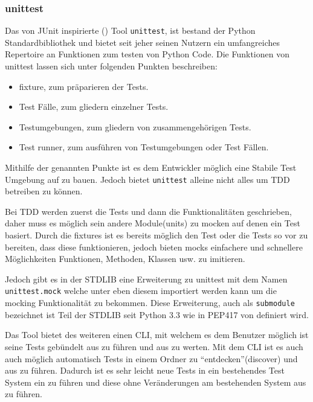 \subsubsection{unittest}\label{python-tools:unittest}

Das von JUnit inspirierte (\cite{docs.python:unittest}) Tool \lstinline|unittest|, ist bestand
der Python Standardbibliothek und bietet seit jeher seinen Nutzern ein umfangreiches
Repertoire an Funktionen zum testen von Python Code.
\noindent
Die Funktionen von unittest lassen sich unter folgenden Punkten beschreiben:
\begin{itemize}
    \item \Gls{fixture}, zum präparieren der Tests.
    \item Test Fälle, zum gliedern einzelner Tests.
    \item Testumgebungen, zum gliedern von zusammengehörigen Tests.
    \item Test runner, zum ausführen von Testumgebungen oder Test Fällen.
\end{itemize}
\noindent
Mithilfe der genannten Punkte ist es dem Entwickler möglich eine Stabile Test Umgebung
auf zu bauen. Jedoch bietet \lstinline{unittest} alleine nicht alles um TDD betreiben zu können.

Bei TDD werden zuerst die Tests und dann die Funktionalitäten geschrieben, daher
muss es möglich sein andere Module(units) zu \gls{mock}en auf denen ein Test basiert.
Durch die \Glspl{fixture} ist es bereits möglich den Test oder die Tests so vor zu
bereiten, dass diese funktionieren, jedoch bieten \Glspl{mock} einfachere und
schnellere Möglichkeiten Funktionen, Methoden, Klassen usw. zu imitieren.

Jedoch gibt es in der STDLIB eine Erweiterung zu unittest mit dem Namen
\lstinline|unittest.mock| welche unter eben diesem importiert werden kann um die 
\gls{mock}ing Funktionalität zu bekommen. Diese Erweiterung, auch als \lstinline|submodule|
bezeichnet ist Teil der STDLIB seit Python 3.3 wie in PEP417 von \cite{python.org:PEP417}
definiert wird.

Das Tool bietet des weiteren einen CLI, mit welchem es dem Benutzer möglich ist
seine Tests gebündelt aus zu führen und aus zu werten. Mit dem CLI ist es auch
auch möglich automatisch Tests in einem Ordner zu "`entdecken"'(discover) und
aus zu führen. Dadurch ist es sehr leicht neue Tests in ein bestehendes Test
System ein zu führen und diese ohne Veränderungen am bestehenden System aus zu
führen.

